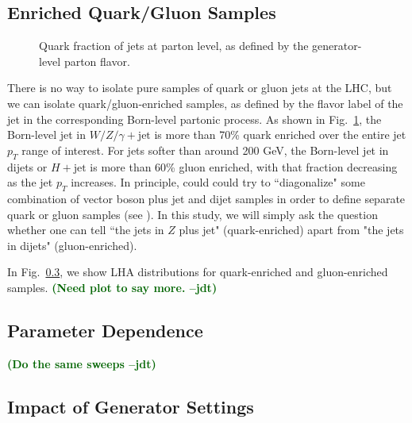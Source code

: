 \documentclass[11pt,letterpaper]{article}
\DeclareRobustCommand{\Fig}[1]{Fig.~\ref{#1}}
\newcommand{\jdt}[1]{\textbf{\textcolor{darkgreen}{(#1 --jdt)}}}
\begin{document}
\subsection{Enriched Quark/Gluon Samples}

\begin{figure}
\centering
{}
\caption{Quark fraction of jets at parton level, as defined by the generator-level parton flavor.}
\label{fig:parton_level_qg_composition}
\end{figure}

There is no way to isolate pure samples of quark or gluon jets at the LHC, but we can isolate quark/gluon-enriched samples, as defined by the flavor label of the jet in the corresponding Born-level partonic process.  As shown in \Fig{fig:parton_level_qg_composition}, the Born-level jet in $W/Z/\gamma + \text{jet}$ is more than 70\% quark enriched over the entire jet $p_T$ range of interest.  For jets softer than around 200 GeV, the Born-level jet in dijets or $H+\text{jet}$ is more than 60\% gluon enriched, with that fraction decreasing as the jet $p_T$ increases.  In principle, could could try to ``diagonalize" some combination of vector boson plus jet and dijet samples in order to define separate quark or gluon samples (see \cite{}).  In this study, we will simply ask the question whether one can tell ``the jets in $Z$ plus jet" (quark-enriched) apart from "the jets in dijets" (gluon-enriched).  

In \Fig{}, we show LHA distributions for quark-enriched and gluon-enriched samples.  \jdt{Need plot to say more.}

\subsection{Parameter Dependence}

\jdt{Do the same sweeps}

\subsection{Impact of Generator Settings}
\end{document}
